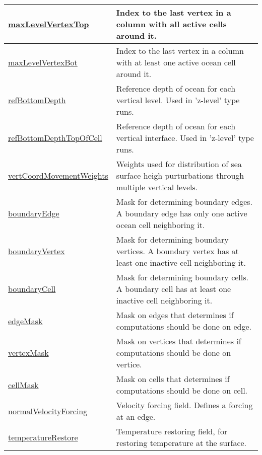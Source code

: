 {\begin{center}
\begin{longtable}{| p{2.0in} | p{4.0in} |}
	\hline
	\hyperref[subsec:var_sec_mesh_maxLevelVertexTop]{maxLevelVertexTop} & Index to the last vertex in a column with all active cells around it. \\
	\hline
	\hyperref[subsec:var_sec_mesh_maxLevelVertexBot]{maxLevelVertexBot} & Index to the last vertex in a column with at least one active ocean cell around it. \\
	\hline
	\hyperref[subsec:var_sec_mesh_refBottomDepth]{refBottomDepth} & Reference depth of ocean for each vertical level. Used in 'z-level' type runs. \\
	\hline
	\hyperref[subsec:var_sec_mesh_refBottomDepthTopOfCell]{refBottomDepthTopOfCell} & Reference depth of ocean for each vertical interface. Used in 'z-level' type runs. \\
	\hline
	\hyperref[subsec:var_sec_mesh_vertCoordMovementWeights]{vertCoordMovementWeights} & Weights used for distribution of sea surface heigh purturbations through multiple vertical levels. \\
	\hline
	\hyperref[subsec:var_sec_mesh_boundaryEdge]{boundaryEdge} & Mask for determining boundary edges. A boundary edge has only one active ocean cell neighboring it. \\
	\hline
	\hyperref[subsec:var_sec_mesh_boundaryVertex]{boundaryVertex} & Mask for determining boundary vertices. A boundary vertex has at least one inactive cell neighboring it. \\
	\hline
	\hyperref[subsec:var_sec_mesh_boundaryCell]{boundaryCell} & Mask for determining boundary cells. A boundary cell has at least one inactive cell neighboring it. \\
	\hline
	\hyperref[subsec:var_sec_mesh_edgeMask]{edgeMask} & Mask on edges that determines if computations should be done on edge. \\
	\hline
	\hyperref[subsec:var_sec_mesh_vertexMask]{vertexMask} & Mask on vertices that determines if computations should be done on vertice. \\
	\hline
	\hyperref[subsec:var_sec_mesh_cellMask]{cellMask} & Mask on cells that determines if computations should be done on cell. \\
	\hline
	\hyperref[subsec:var_sec_mesh_normalVelocityForcing]{normalVelocityForcing} & Velocity forcing field. Defines a forcing at an edge. \\
	\hline
	\hyperref[subsec:var_sec_mesh_temperatureRestore]{temperatureRestore} & Temperature restoring field, for restoring temperature at the surface. \\

\end{longtable}
\end{center}}
